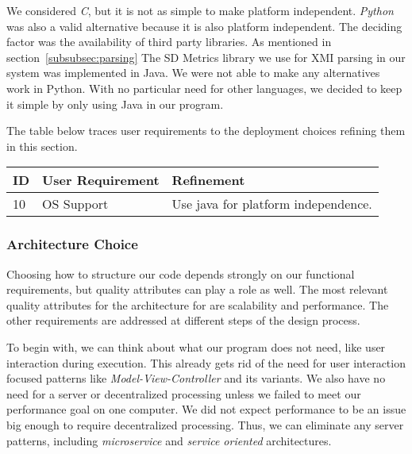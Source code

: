 \documentclass[11pt]{article}
\begin{document}
    We considered \textit{C}, but it is not as simple to make platform independent.
    \textit{Python} was also a valid alternative because it is also platform independent.
    The deciding factor was the availability of third party libraries.
    As mentioned in section~\ref{subsubsec:parsing} The SD Metrics library we use for XMI parsing in our system was implemented in Java.
    We were not able to make any alternatives work in Python.
    With no particular need for other languages, we decided to keep it simple by only using Java in our program.

    The table below traces user requirements to the deployment choices refining them in this section.
    \begin{table}[htbp]
        \centering
        \begin{tabularx}{\textwidth}{| l | l | X |}
            \hline
            \textbf{ID} & \textbf{User Requirement} & \textbf{Refinement} \\
            \hline
            10 & OS Support & Use java for platform independence. \\ \hline
        \end{tabularx}\label{tab:os-choice-table}
    \end{table}

    \newpage
    \subsubsection{Architecture Choice}
    Choosing how to structure our code depends strongly on our functional requirements,
    but quality attributes can play a role as well.
    The most relevant quality attributes for the architecture for are scalability and performance.
    The other requirements are addressed at different steps of the design process.

    To begin with, we can think about what our program does not need, like user interaction during execution.
    This already gets rid of the need for user interaction focused patterns like \textit{Model-View-Controller} and its variants.
    We also have no need for a server or decentralized processing unless we failed to meet our performance goal on one computer.
    We did not expect performance to be an issue big enough to require decentralized processing.
    Thus, we can eliminate any server patterns, including \textit{microservice} and \textit{service oriented} architectures.
\end{document}
